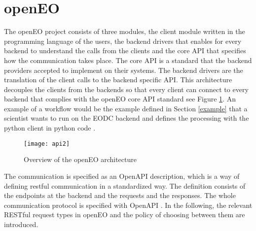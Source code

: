 \documentclass[draft,final]{vutinfth} %
\begin{document}
\section{openEO}\label{openEO}
The openEO project consists of three modules, the client module written in the programming language of the users, the backend drivers that enables for every backend to understand the calls from the clients and the core API that specifies how the communication takes place. The core API is a standard that the backend providers accepted to implement on their systems. The backend drivers are the translation of the client calls to the backend specific API. This architecture decouples the clients from the backends so that every client can connect to every backend that complies with the openEO core API standard see Figure \ref{fig:api2}. An example of a workflow would be the example defined in Section \ref{example} that a scientist wants to run on the EODC backend and defines the processing with the python client in python code \cite{openeo}. 

\begin{figure}[h]
	\centering
	\texttt{[image: api2]}
	\caption{Overview of the openEO architecture}
	\label{fig:api2} %
\end{figure}


The communication is specified as an OpenAPI description, which is a way of defining \gls{rest}ful communication in a standardized way. The definition consists of the endpoints at the backend and the requests and the responses. The whole communication protocol is specified with OpenAPI \cite{openapi}. 
In the following, the relevant RESTful request types in openEO and the policy of choosing between them are introduced.
\end{document}
